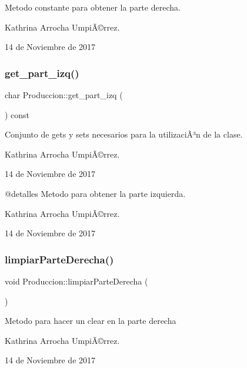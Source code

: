Metodo constante para obtener la parte derecha.

Kathrina Arrocha UmpiÃ©rrez.

14 de Noviembre de 2017 \mbox{\label{class_produccion_ac863aa129550b93bf54b8c6489b432fe}} 
\subsubsection{\texorpdfstring{get\+\_\+part\+\_\+izq()}{get\_part\_izq()}}
{\footnotesize\ttfamily char Produccion\+::get\+\_\+part\+\_\+izq (\begin{DoxyParamCaption}{ }\end{DoxyParamCaption}) const}

Conjunto de gets y sets necesarios para la utilizaciÃ³n de la clase.

Kathrina Arrocha UmpiÃ©rrez.

14 de Noviembre de 2017 \begin{DoxyVerb} @detalles Metodo para obtener la parte izquierda.
\end{DoxyVerb}


Kathrina Arrocha UmpiÃ©rrez.

14 de Noviembre de 2017 \mbox{\label{class_produccion_a0a3069bb47b350abd3adcd82a0aa0f3c}} 
\subsubsection{\texorpdfstring{limpiar\+Parte\+Derecha()}{limpiarParteDerecha()}}
{\footnotesize\ttfamily void Produccion\+::limpiar\+Parte\+Derecha (\begin{DoxyParamCaption}{ }\end{DoxyParamCaption})}

Metodo para hacer un clear en la parte derecha

Kathrina Arrocha UmpiÃ©rrez.

14 de Noviembre de 2017 \mbox{\label{class_produccion_a31a114a57efbe80598cdfc5b739ed3b4}} 
